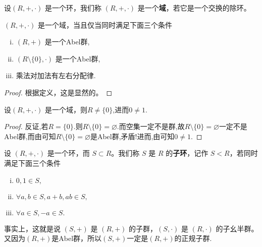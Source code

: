 \documentclass[../../main.tex]{subfiles}
\begin{document}
\begin{definition}[域]
设$(R, +, \cdot)$ 是一个环，我们称 $(R, +, \cdot)$ 是一个\textbf{域}，若它是一个交换的除环。
\end{definition}

\begin{proposition}[域的充要条件]\label{proposition:域的充要条件}
$(R, +, \cdot)$ 是一个域，当且仅当同时满足下面三个条件
\begin{enumerate}[(i)]
\item $(R, +)$  是一个Abel群,

\item $(R\setminus\{0\}, \cdot)$ 是一个Abel群,

\item 乘法对加法有左右分配律.
\end{enumerate}
\end{proposition}
\begin{proof}
根据定义，这是显然的。
\end{proof}

\begin{proposition}\label{proposition:域中加法单位元和乘法单位元一定不相等即0不等于1}
设$(R, +, \cdot)$ 是一个域，则$R\ne \{0\}$,进而$0\ne 1$.
\end{proposition}
\begin{proof}
反证,若$R=\{0\}$.则$R\setminus \{0\}=\varnothing.$而空集一定不是群,故$R\setminus \{0\}=\varnothing$一定不是Abel群,而由可知$R\setminus \{0\}=\varnothing$是Abel群,矛盾!进而,由可知$0\ne 1.$
\end{proof}

\begin{definition}[子环]
设 $(R, +, \cdot)$ 是一个环，而 $S \subset R$。我们称 $S$ 是 $R$ 的\textbf{子环}，记作 $S < R$，若同时满足下面三个条件
\begin{enumerate}[(i)]
\item $0, 1 \in S,$

\item $\forall a, b \in S, a + b, ab \in S,$

\item $\forall a \in S, -a \in S.$
\end{enumerate}
\end{definition}
\begin{note}
事实上，这就是说 $(S, +)$ 是 $(R, +)$ 的子群，$(S, \cdot)$ 是 $(R, \cdot)$ 的子幺半群。 又因为$(R,+)$是Abel群，所以$(S,+)$一定是$(R,+)$的正规子群.
\end{note}
\end{document}
